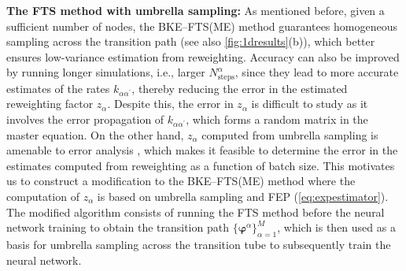 \documentclass{article}
\numberwithin{equation}{section}
\theoremstyle{definition}
\theoremstyle{remark}
\def\varphib{\boldsymbol{\varphi}}
\begin{document}
\textbf{The FTS method with umbrella sampling:} As mentioned before, given a sufficient number of nodes, the BKE--FTS(ME) method guarantees homogeneous sampling across the transition path (see also \cref{fig:1dresults}(b)), which better ensures low-variance estimation from reweighting. Accuracy can also be improved by running longer simulations, i.e., larger $N_\mathrm{steps}^\alpha$, since they lead to more accurate estimates of the rates $k_{\alpha \alpha^\prime}$,
thereby reducing the error in the estimated reweighting factor $z_\alpha$. 
Despite this, the error in $z_\alpha$ is difficult to study as it involves the error propagation of $k_{\alpha \alpha^\prime}$, which forms a random matrix in the master equation. 
On the other hand, $z_\alpha$ computed from umbrella sampling is amenable to error analysis \cite{thiede2016eigenvector,shirts2005comparison}, which makes it feasible to determine the error in the estimates computed from reweighting as a function of batch size. 
This motivates us to construct a modification to the BKE--FTS(ME) method where the computation of $z_\alpha$ is based on umbrella sampling and FEP (\cref{eq:expestimator}).  
The modified algorithm consists of running the FTS method before the neural network training to obtain the transition path $\{ \varphib^\alpha \}_{\alpha=1}^M$, which is then used as a basis for umbrella sampling across the transition tube to subsequently train the neural network. 
\end{document}
